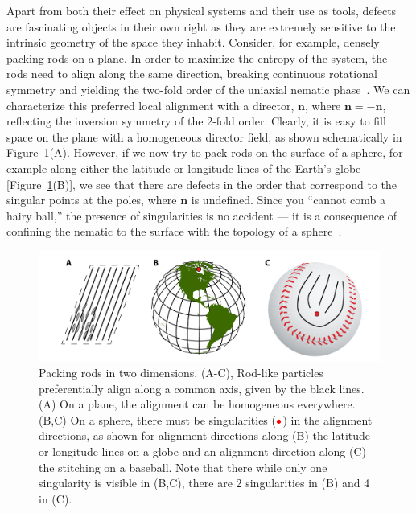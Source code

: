 Apart from both their effect on physical systems and their use as tools, defects are fascinating objects in their own right as they are extremely sensitive to the intrinsic geometry of the space they inhabit.
Consider, for example, densely packing rods on a plane.
In order to maximize the entropy of the system, the rods need to align along the same direction, breaking continuous rotational symmetry and yielding the two-fold order of the uniaxial nematic phase~\cite{RN204}.
We can characterize this preferred local alignment with a director, $\mathbf{n}$, where $\mathbf{n} = \mathbf{-n}$, reflecting the inversion symmetry of the 2-fold order.
Clearly, it is easy to fill space on the plane with a homogeneous director field, as shown schematically in Figure~\ref{f:1-RodsPlane}(A).
However, if we now try to pack rods on the surface of a sphere, for example along either the latitude or longitude lines of the Earth's globe [Figure~\ref{f:1-RodsPlane}(B)], we see that there are defects in the order that correspond to the singular points at the poles, where $\mathbf{n}$ is undefined.
Since you ``cannot comb a hairy ball,'' the presence of singularities is no accident --- it is a consequence of confining the nematic to the surface with the topology of a sphere~\cite{RN209,RN169}.
\begin{figure}
  \centering
  \includegraphics{figures/C1/Ch1-Figs_RodsPlane.png}
  \caption{Packing rods in two dimensions.
  (A-C), Rod-like particles preferentially align along a common axis, given by the black lines.
  (A) On a plane, the alignment can be homogeneous everywhere.
  (B,C) On a sphere, there must be singularities (${\color{red} \bullet}$) in the alignment directions, as shown for alignment directions along (B) the latitude or longitude lines on a globe and an alignment direction along (C) the stitching on a baseball.
  Note that there while only one singularity is visible in (B,C), there are 2 singularities in (B) and 4 in (C).}\label{f:1-RodsPlane}
\end{figure}

